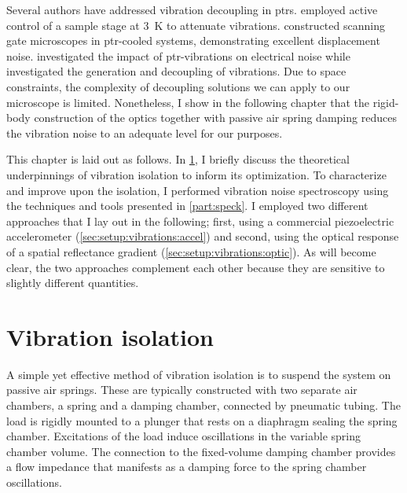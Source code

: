Several authors have addressed vibration decoupling in \glspl{ptr}.
\textcite{Caparrelli2006} employed active control of a sample stage at \qty{3}{\kelvin} to attenuate vibrations.
\textcite{Pelliccione2013,Oh2021,Esser2024} constructed scanning gate microscopes in \gls{ptr}-cooled systems, demonstrating excellent displacement noise.
\textcite{Kalra2016} investigated the impact of \gls{ptr}-vibrations on electrical noise while \textcite{Riabzev2009,Olivieri2017,Schmoranzer2019} investigated the generation and decoupling of vibrations.
Due to space constraints, the complexity of decoupling solutions we can apply to our microscope is limited.
Nonetheless, I show in the following chapter that the rigid-body construction of the optics together with passive air spring damping reduces the vibration noise to an adequate level for our purposes.

This chapter is laid out as follows.
In \cref{sec:setup:vibrations:isolation}, I briefly discuss the theoretical underpinnings of vibration isolation to inform its optimization.
To characterize and improve upon the isolation, I performed vibration noise spectroscopy using the techniques and tools presented in \cref{part:speck}.
I employed two different approaches that I lay out in the following; first, using a commercial piezoelectric accelerometer (\cref{sec:setup:vibrations:accel}) and second, using the optical response of a spatial reflectance gradient (\cref{sec:setup:vibrations:optic}).
As will become clear, the two approaches complement each other because they are sensitive to slightly different quantities.

\section{Vibration isolation}\label{sec:setup:vibrations:isolation}
A simple yet effective method of vibration isolation is to suspend the system on passive air springs.
These are typically constructed with two separate air chambers, a spring and a damping chamber, connected by pneumatic tubing.
The load is rigidly mounted to a plunger that rests on a diaphragm sealing the spring chamber.
Excitations of the load induce oscillations in the variable spring chamber volume.
The connection to the fixed-volume damping chamber provides a flow impedance
that manifests as a damping force to the spring chamber oscillations.


